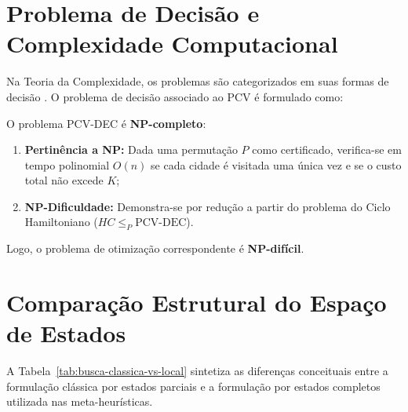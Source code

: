 \documentclass[11pt]{article}
\begin{document}
\section{Problema de Decisão e Complexidade Computacional} \label{ap:pdcv}

Na Teoria da Complexidade, os problemas são categorizados em suas formas de decisão \cite{vignatti2024algoritmos}. O problema de decisão associado ao PCV é formulado como:

\begin{center}
\noindent{}
\end{center}

O problema PCV-DEC é \textbf{NP-completo}:
\begin{enumerate}
    \item \textbf{Pertinência a NP:} Dada uma permutação $P$ como certificado, verifica-se em tempo polinomial $O(n)$ se cada cidade é visitada uma única vez e se o custo total não excede $K$;
    \item \textbf{NP-Dificuldade:} Demonstra-se por redução a partir do problema do Ciclo Hamiltoniano ($HC \le_P \text{PCV-DEC}$).
\end{enumerate}
Logo, o problema de otimização correspondente é \textbf{NP-difícil}.

\section{Comparação Estrutural do Espaço de Estados} \label{ap:busca}

A Tabela~\ref{tab:busca-classica-vs-local} sintetiza as diferenças conceituais entre a formulação clássica por estados parciais e a formulação por estados completos utilizada nas meta-heurísticas.
\end{document}
